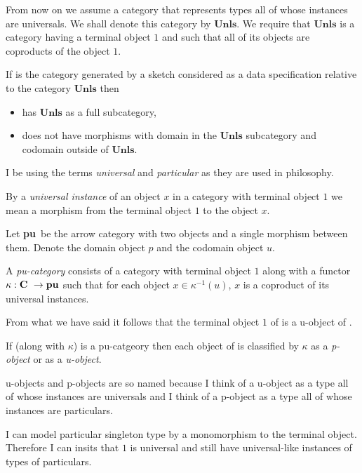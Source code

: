 \documentclass[10pt,a4paper]{article}
\theoremstyle{remark}
\renewcommand{\term}[1]{\textit{#1}}  %
\begin{document}
\newcommand{\universals}{\textbf{Unls}}


From now on we  assume a category that represents types all of whose instances are universals. 
We shall denote this category by $\universals$. 
We require that $\universals$ is a category having a terminal object $1$ and such that all of its objects 
are coproducts of the object $1$. 

If \catcw is the category generated by a sketch considered as a data specification relative to 
the category $\universals$  then 
\begin{itemize}
\item \catcw has $\universals$ as a full subcategory,
\item \catcw does not have morphisms with domain in the $\universals$ subcategory 
and codomain outside of $\universals$.
\end{itemize}

\begin{aside}
\newcommand{\puarrowcat}{\textbf{pu}}

I be using the terms \term{universal} and \term{particular} as they are used in philosophy.

By a \textit{universal instance} of an object $x$ in a category with terminal object $1$ we mean a morphism from the terminal object $1$ to the object $x$.

Let \puarrowcat\  be the arrow category with two objects and a single morphism between them.
Denote the domain object $p$ and  the codomain object $u$.

A \term{pu-category} consists of a category \catcw with terminal object $1$ 
along with  a functor $\kappa: \catcw \morph \puarrowcat$ 
such that for each object $x \in \kappa^{-1}(u)$, $x$ is a coproduct of its universal instances.

From what we have said it follows that the terminal object $1$ of \catcw is a u-object of \catc.

If \catcw (along with $\kappa$) is a pu-catgeory then each object of \catcw is
classified by $\kappa$  as a \term{p-object} or as a \term{u-object}. 

u-objects and p-objects are so named because I
think of a u-object as a type all of whose instances are universals and I think of a p-object as a type
all of whose instances are particulars. 
\end{aside}

\begin{newtt}
I can model particular singleton type by a monomorphism to the terminal object. Therefore
I can insits that $1$ is universal and still have universal-like instances of types of particulars.
\end{newtt}
\end{document}
